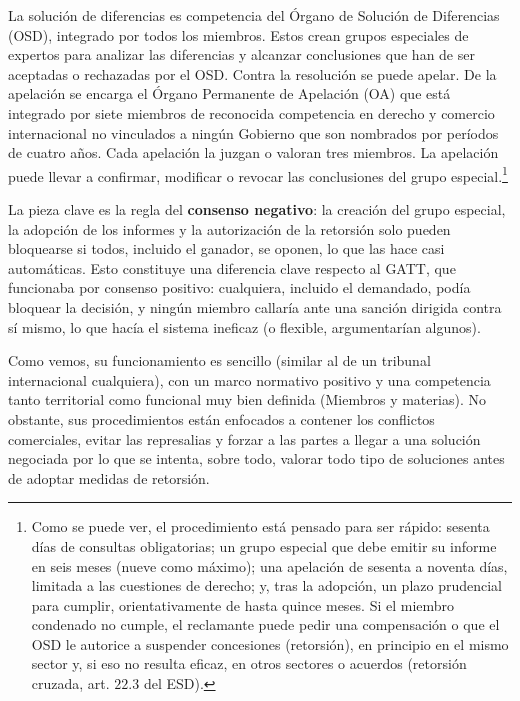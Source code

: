 \documentclass[10pt,a4paper]{article}
\begin{document}
La solución de diferencias es competencia del Órgano de Solución de Diferencias (OSD), integrado por todos los miembros. Estos crean grupos especiales de expertos para analizar las diferencias y alcanzar conclusiones que han de ser aceptadas o rechazadas por el OSD. Contra la resolución se puede apelar. De la apelación se encarga el Órgano Permanente de Apelación (OA) que está integrado por siete miembros de reconocida competencia en derecho y comercio internacional no vinculados a ningún Gobierno que son nombrados por períodos de cuatro años. Cada apelación la juzgan o valoran tres miembros. La apelación puede llevar a confirmar, modificar o revocar las conclusiones del grupo especial.\footnote{%
  Como se puede ver, el procedimiento está pensado para ser rápido: sesenta días de consultas obligatorias; un grupo especial que debe emitir su informe en seis meses (nueve como máximo); una apelación de sesenta a noventa días, limitada a las cuestiones de derecho; y, tras la adopción, un plazo prudencial para cumplir, orientativamente de hasta quince meses. Si el miembro condenado no cumple, el reclamante puede pedir una compensación o que el OSD le autorice a suspender concesiones (retorsión), en principio en el mismo sector y, si eso no resulta eficaz, en otros sectores o acuerdos (retorsión cruzada, art. $22.3$ del ESD).
}

La pieza clave es la regla del \textbf{consenso negativo}: la creación del grupo especial, la adopción de los informes y la autorización de la retorsión solo pueden bloquearse si todos, incluido el ganador, se oponen, lo que las hace casi automáticas. Esto constituye una diferencia clave respecto al GATT, que funcionaba por consenso positivo: cualquiera, incluido el demandado, podía bloquear la decisión, y ningún miembro callaría ante una sanción dirigida contra sí mismo, lo que hacía el sistema ineficaz (o flexible, argumentarían algunos).

Como vemos, su funcionamiento es sencillo (similar al de un tribunal internacional cualquiera), con un marco normativo positivo y una competencia tanto territorial como funcional muy bien definida (Miembros y materias). No obstante, sus procedimientos están enfocados a contener los conflictos comerciales, evitar las represalias y forzar a las partes a llegar a una solución negociada por lo que se intenta, sobre todo, valorar todo tipo de soluciones antes de adoptar medidas de retorsión. 
\end{document}
